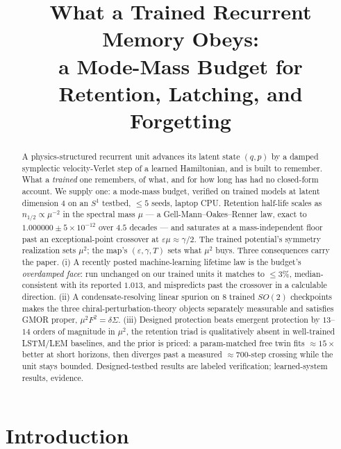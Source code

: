 \documentclass{article}
\title{What a Trained Recurrent Memory Obeys:\\ a Mode-Mass Budget for Retention, Latching, and Forgetting}
\author{}
\begin{document}
\maketitle


\begin{abstract}
A physics-structured recurrent unit advances its latent state $(q,p)$ by a damped symplectic velocity-Verlet step of a learned Hamiltonian, and is built to remember. What a \emph{trained} one remembers, of what, and for how long has had no closed-form account. We supply one: a mode-mass budget, verified on trained models at latent dimension $4$ on an $S^1$ testbed, $\le5$ seeds, laptop CPU. Retention half-life scales as $n_{1/2}\propto\mu^{-2}$ in the spectral mass $\mu$ --- a Gell-Mann--Oakes--Renner law, exact to $1.000000\pm5\!\times\!10^{-12}$ over $4.5$ decades --- and saturates at a mass-independent floor past an exceptional-point crossover at $\varepsilon\mu\approx\gamma/2$. The trained potential's symmetry realization sets $\mu^2$; the map's $(\varepsilon,\gamma,T)$ sets what $\mu^2$ buys. Three consequences carry the paper. (i) A recently posted machine-learning lifetime law is the budget's \emph{overdamped face}: run unchanged on our trained units it matches to $\le3\%$, median-consistent with its reported $1.013$, and mispredicts past the crossover in a calculable direction. (ii) A condensate-resolving linear spurion on $8$ trained $SO(2)$ checkpoints makes the three chiral-perturbation-theory objects separately measurable and satisfies GMOR proper, $\mu^2F^2=\delta\Sigma$. (iii) Designed protection beats emergent protection by $13$--$14$ orders of magnitude in $\mu^2$, the retention triad is qualitatively absent in well-trained LSTM/LEM baselines, and the prior is priced: a param-matched free twin fits $\approx15\times$ better at short horizons, then diverges past a measured $\approx700$-step crossing while the unit stays bounded. Designed-testbed results are labeled verification; learned-system results, evidence.
\end{abstract}

\section{Introduction}\label{sec:intro}
\end{document}
